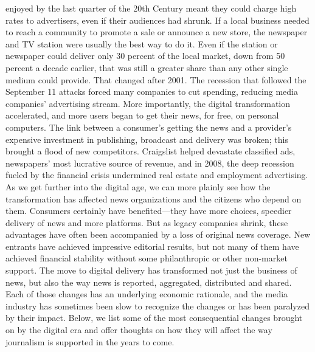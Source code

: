 enjoyed by the last quarter of the 20th Century meant they could charge
high rates to advertisers, even if their audiences had shrunk. If a local business
needed to reach a community to promote a sale or announce a new store, the
newspaper and TV station were usually the best way to do it. Even if the station
or newspaper could deliver only 30 percent of the local market, down from
50 percent a decade earlier, that was still a greater share than any other single
medium could provide.
That changed after 2001. The recession that followed the September 11 attacks
forced many companies to cut spending, reducing media companies’ advertising
stream. More importantly, the digital transformation accelerated, and more users
began to get their news, for free, on personal computers. The link between
a consumer’s getting the news and a provider’s expensive investment in publishing,
broadcast and delivery was broken; this brought a flood of new competitors.
Craigslist helped devastate classified ads, newspapers’ most lucrative source of revenue,
and in 2008, the deep recession fueled by the financial crisis undermined
real estate and employment advertising.
As we get further into the digital age, we can more plainly see how the transformation
has affected news organizations and the citizens who depend on them.
Consumers certainly have benefited—they have more choices, speedier delivery
of news and more platforms. But as legacy companies shrink, these advantages
have often been accompanied by a loss of original news coverage. New entrants
have achieved impressive editorial results, but not many of them have achieved
financial stability without some philanthropic or other non-market support.
The move to digital delivery has transformed not just the business of news, but
also the way news is reported, aggregated, distributed and shared. Each of those
changes has an underlying economic rationale, and the media industry has sometimes
been slow to recognize the changes or has been paralyzed by their impact.
Below, we list some of the most consequential changes brought on by the digital
era and offer thoughts on how they will affect the way journalism is supported
in the years to come.

